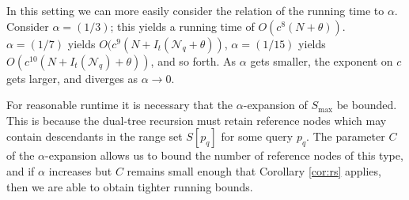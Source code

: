 


In this setting we can more easily consider the relation of the running time to
$\alpha$.  Consider $\alpha = (1 / 3)$; this yields a running time of $O(c^8 (N
+ \theta))$.  $\alpha = (1 / 7)$ yields $O(c^9 (N + I_t(\mathscr{N}_q +
\theta))$, $\alpha = (1 / 15)$ yields $O(c^{10} (N + I_t(\mathscr{N}_q) +
\theta))$, and so forth.  As $\alpha$ gets smaller, the exponent on $c$ gets
larger, and diverges as $\alpha \to 0$.

For reasonable runtime it is necessary that the $\alpha$-expansion of $S_{\max}$
be bounded.  This is because the dual-tree recursion must retain reference nodes
which may contain descendants in the range set $S[p_q]$ for some query $p_q$.
The parameter $C$ of the $\alpha$-expansion allows us to bound the number of
reference nodes of this type, and if $\alpha$ increases but $C$ remains small
enough that Corollary \ref{cor:rs} applies, then we are able to obtain tighter
running bounds.




